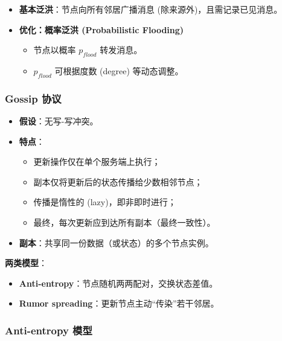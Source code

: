 \begin{itemize}
\item \textbf{基本泛洪}：节点向所有邻居广播消息 (除来源外)，且需记录已见消息。
\item \textbf{优化：概率泛洪 (Probabilistic Flooding)}
  \begin{itemize}
  \item 节点以概率 $p_{flood}$ 转发消息。
  \item $p_{flood}$ 可根据度数 (degree) 等动态调整。
  \end{itemize}
\end{itemize}

\subsubsection{Gossip 协议}

\begin{itemize}
\item \textbf{假设}：无写-写冲突。
\item \textbf{特点}：
  \begin{itemize}
  \item 更新操作仅在单个服务端上执行；
  \item 副本仅将更新后的状态传播给少数相邻节点；
  \item 传播是惰性的 (lazy)，即非即时进行；
  \item 最终，每次更新应到达所有副本（最终一致性）。
  \end{itemize}
\item \textbf{副本}：共享同一份数据（或状态）的多个节点实例。
\end{itemize}

\textbf{两类模型}：
\begin{itemize}
\item \textbf{Anti-entropy}：节点随机两两配对，交换状态差值。
\item \textbf{Rumor spreading}：更新节点主动“传染”若干邻居。
\end{itemize}

\subsubsection{Anti-entropy 模型}

